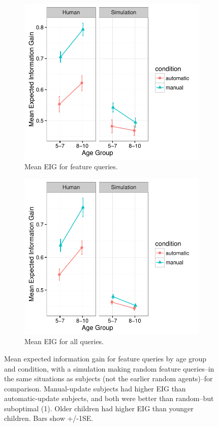 \documentclass[man,floatsintext]{apa6}
\begin{document}
\begin{figure}[t]
  \begin{subfigure}{.42\textwidth}
  \centering
  \includegraphics[width=.9\linewidth]{figures/EIG_by_ageGroup_n_condition_with_random_sims}
  \caption{Mean EIG for feature queries.}
  \label{fig:sfig11}
\end{subfigure}%
\begin{subfigure}{.58\textwidth}
  \centering
  \includegraphics[width=.9\linewidth]{figures/EIGall_by_ageGroup_n_condition_with_random_sims}
  \caption{Mean EIG for all queries.}
  \label{fig:sfig12}
\end{subfigure}
 \caption{Mean expected information gain for feature queries by age group and condition, 
with a simulation making random feature queries--in the same situations as subjects (not the earlier random agents)--for comparison. Manual-update subjects had higher EIG than automatic-update subjects, and both were better than random--but suboptimal (1). Older children had higher EIG than younger children. Bars show +/-1SE.}
\label{fig:EIG_by_age}
\end{figure} 
\end{document}
